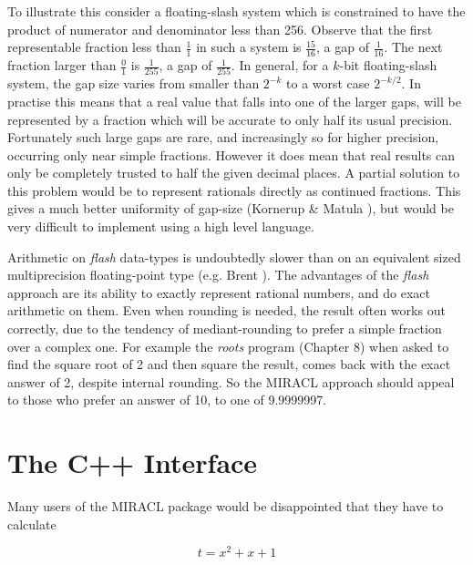       To illustrate this 
      consider a floating-slash system which is  constrained  to  have  the 
      product of numerator and denominator less than 256. Observe that the 
      first representable fraction less than $\frac{1}{1}$ in such a system is 
      $\frac{15}{16}$, a gap of $\frac{1}{16}$. The next fraction larger 
      than $\frac{0}{1}$ is $\frac{1}{255}$,  a gap of $\frac{1}{255}$.  
      In general,  for a $k$-bit  floating-slash 
      system,  the gap size varies from smaller than $2^{-k}$ to a worst case 
      $2^{-k/2}$. In practise this means that a real value  that  falls  into 
      one of the larger gaps,  will be represented by a fraction which will 
      be accurate to only half its usual precision.  Fortunately such large 
      gaps  are rare,  and increasingly so for higher precision,  occurring 
      only near simple fractions.  However it does mean that  real  results 
      can  only  be completely trusted to half the given decimal places.  A 
      partial solution to this problem  would  be  to  represent  rationals 
      directly as continued fractions.  This gives a much better uniformity 
      of gap-size (Kornerup \& Matula \cite{Korn85}),  but would be very 
      difficult to implement using a high level language.  

      Arithmetic  on  {\em flash}  data-types  is undoubtedly slower than on an 
      equivalent  sized  multiprecision  floating-point  type  (e.g.  Brent 
      \cite{Brent78}).  The  advantages  of  the  {\em flash} approach are its ability to 
      exactly represent rational numbers,  and do exact arithmetic on them. 
      Even  when rounding is needed,  the result often works out correctly, 
      due to the tendency of mediant-rounding to prefer a  simple  fraction 
      over  a  complex  one.  For example the {\em roots} program (Chapter 8) 
      when asked to find the square root of 2 and then square  the  result, 
      comes back with the exact answer of 2, despite internal rounding.  So 
      the MIRACL approach should appeal to those who prefer  an  answer  of 
      10, to one of 9.9999997.  
\cleardoublepage
\chapter{The C++ Interface}

      Many users of the MIRACL package would be disappointed that they have 
      to calculate 
  
                          $$  t = x^{2}  + x + 1  $$

